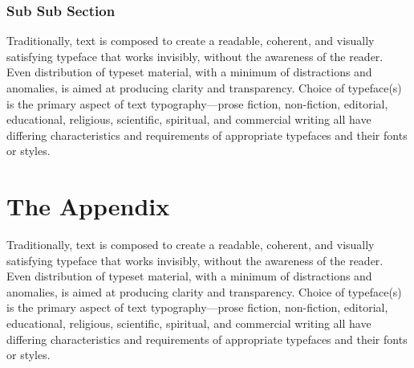 \documentclass[twoside]{xarticle}
\begin{document}
\subsubsection{Sub Sub Section}

Traditionally, text is composed to create a readable, coherent, and visually
satisfying typeface that works invisibly, without the awareness of the reader.
Even distribution of typeset material, with a minimum of distractions and
anomalies, is aimed at producing clarity and transparency. Choice of typeface(s)
is the primary aspect of text typography—prose fiction, non-fiction, editorial,
educational, religious, scientific, spiritual, and commercial writing all have
differing characteristics and requirements of appropriate typefaces and their
fonts or styles.

\clearpage

\appendix

\thispagestyle{empty}
\section{The Appendix}

Traditionally, text is composed to create a readable, coherent, and visually
satisfying typeface that works invisibly, without the awareness of the reader.
Even distribution of typeset material, with a minimum of distractions and
anomalies, is aimed at producing clarity and transparency. Choice of typeface(s)
is the primary aspect of text typography—prose fiction, non-fiction, editorial,
educational, religious, scientific, spiritual, and commercial writing all have
differing characteristics and requirements of appropriate typefaces and their
fonts or styles.
\end{document}
